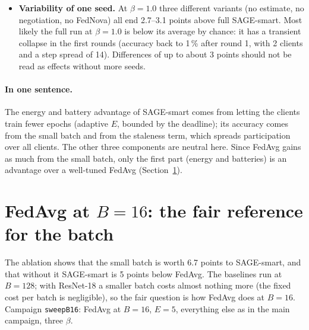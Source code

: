 \documentclass[11pt,a4paper]{article}
\begin{document}
\begin{itemize}
\begin{itemize}
                estimate (its error is even slightly lower: 0.015--0.027 against
                0.018--0.056, probably because the estimate does not foresee
                recharges);
          \item refusals are few (12--74 per run); without negotiation 6--82
                clients per run download the model and then withdraw, which
                costs little. The negotiation saves 3 and 6 devices at
                $\beta=0.1$ and 0.5, where refusals exist;
          \item plain averaging works as well as FedNova with a step spread of
                10--12.
        \end{itemize}
  \item \textbf{Variability of one seed.} At $\beta=1.0$ three different
        variants (no estimate, no negotiation, no FedNova) all end 2.7--3.1
        points above full SAGE-smart. Most likely the full run at $\beta=1.0$
        is below its average by chance: it has a transient collapse in the first
        rounds (accuracy back to 1\,\% after round 1, with 2 clients and a step
        spread of 14). Differences of up to about 3 points should not be read
        as effects without more seeds.
\end{itemize}

\paragraph{In one sentence.} The energy and battery advantage of SAGE-smart
comes from letting the clients train fewer epochs (adaptive $E$, bounded by
the deadline); its accuracy comes from the small batch and from the staleness
term, which spreads participation over all clients. The other three components
are neutral here. Since FedAvg gains as much from the small batch, only the
first part (energy and batteries) is an advantage over a well-tuned FedAvg
(Section~\ref{sec:b16}).

\section{FedAvg at $B=16$: the fair reference for the batch}
\label{sec:b16}

The ablation shows that the small batch is worth 6.7 points to SAGE-smart, and
that without it SAGE-smart is 5 points below FedAvg. The baselines run at
$B=128$; with ResNet-18 a smaller batch costs almost nothing more (the fixed
cost per batch is negligible), so the fair question is how FedAvg does at
$B=16$. Campaign \texttt{sweepB16}: FedAvg at $B=16$, $E=5$, everything else as
in the main campaign, three $\beta$.
\end{document}
